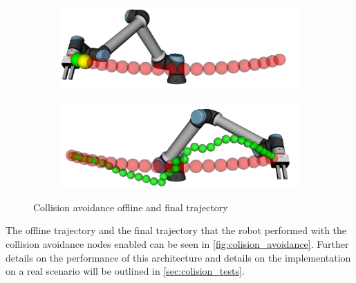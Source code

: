 \begin{figure}[h]
    \centering
    \begin{subfigure}{.50\linewidth}
      \centering
      \includegraphics[width=\linewidth]{figs/chp4/col_avoid_start.png}
    \end{subfigure}%
    \begin{subfigure}{.50\linewidth}
        \centering
        \includegraphics[width=\linewidth]{figs/chp4/col_avoid_end.png}
    \end{subfigure}
    \caption{Collision avoidance offline and final trajectory}
    \label{fig:colision_avoidance}
\end{figure}

\par The offline trajectory and the final trajectory that the robot performed with the collision avoidance nodes enabled can be seen in \autoref{fig:colision_avoidance}. Further details on the performance of this architecture and details on the implementation on a real scenario will be outlined in \autoref{sec:colision_tests}.
